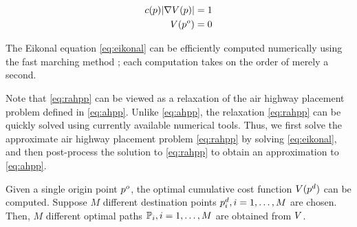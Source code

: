 \begin{equation}
\label{eq:eikonal}
\begin{aligned}
c(p)|\nabla V(p)| &= 1 \\
V(p^o) &= 0
\end{aligned}
\end{equation}

The Eikonal equation \eqref{eq:eikonal} can be efficiently computed numerically using the fast marching method \cite{Sethian96}; each computation takes on the order of merely a second.

Note that \eqref{eq:rahpp} can be viewed as a relaxation of the air highway placement problem defined in \eqref{eq:ahpp}. Unlike \eqref{eq:ahpp}, the relaxation \eqref{eq:rahpp} can be quickly solved using currently available numerical tools. Thus, we first solve the approximate air highway placement problem \eqref{eq:rahpp} by solving \eqref{eq:eikonal}, and then post-process the solution to \eqref{eq:rahpp} to obtain an approximation to \eqref{eq:ahpp}.

Given a single origin point $p^o$, the optimal cumulative cost function $V(p^d)$ can be computed. Suppose $M$ different destination points $p^d_i,i=1,\ldots,M$ are chosen. Then, $M$ different optimal paths $\mathbb{P}_i,i=1,\ldots,M$ are obtained from $V$.